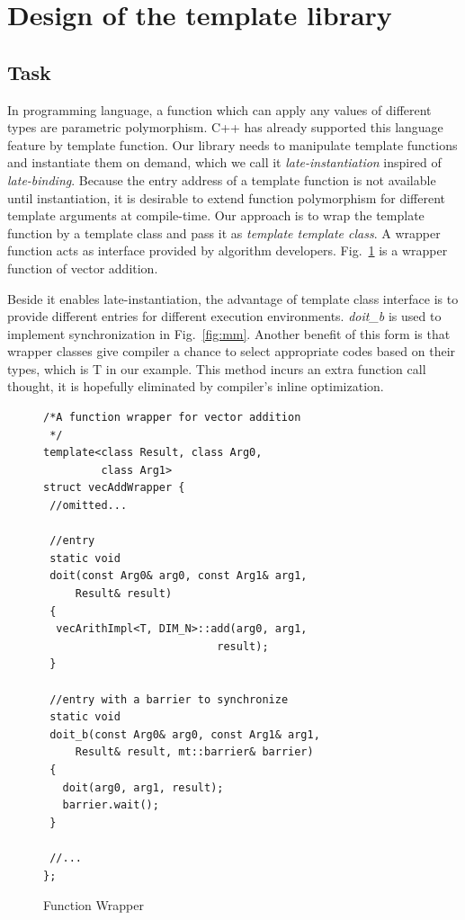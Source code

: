 \section{Design of the template library}
\subsection{Task}\label{section:interface}
In programming language, a function which can apply any values of
different types are parametric polymorphism. C++ has already supported
this language feature by template function. Our library needs to
manipulate template functions and instantiate them on demand, which we
call it \emph{late-instantiation} inspired of
\emph{late-binding}. Because the entry address of a template function is not available until instantiation, it is desirable to extend function
polymorphism for different template arguments  at compile-time. Our
approach is to wrap the template function by a template class and pass
it as \emph{template template class}. A wrapper function acts
as interface provided by algorithm developers. Fig.~\ref{lst:wrapper} is a wrapper function of vector addition. 

Beside it enables late-instantiation, the advantage of template class interface
is to provide different entries for different execution environments. \emph{doit\_b} is
used to implement synchronization in Fig.~\ref{fig:mm}.  Another benefit of
this form is that wrapper classes  give compiler a chance to select
appropriate codes based on their types, which is T in our example. This method incurs an extra function call  thought, it is hopefully  eliminated by
compiler's inline optimization.

\begin{figure}[!htp]
\begin{minipage}[tb]{\linewidth}
\makebox[\textwidth]{\hrulefill}
\begin{small}
\begin{verbatim}
/*A function wrapper for vector addition
 */
template<class Result, class Arg0, 
         class Arg1>
struct vecAddWrapper {
 //omitted...
 
 //entry
 static void 
 doit(const Arg0& arg0, const Arg1& arg1, 
     Result& result)
 {
  vecArithImpl<T, DIM_N>::add(arg0, arg1, 
                           result);
 }

 //entry with a barrier to synchronize
 static void 
 doit_b(const Arg0& arg0, const Arg1& arg1, 
     Result& result, mt::barrier& barrier)
 {
   doit(arg0, arg1, result);
   barrier.wait();
 }

 //...
};
\end{verbatim}
\end{small}
\makebox[\textwidth]{\hrulefill}
\end{minipage}
\caption{Function Wrapper}\label{lst:wrapper}
\end{figure}


